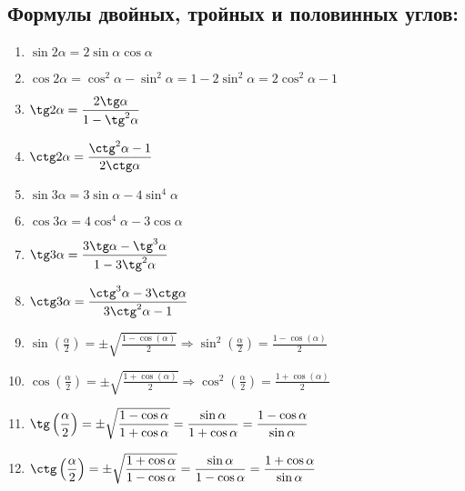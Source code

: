 \documentclass[12pt, a4paper]{article}
\begin{document}
\subsection{Формулы двойных, тройных и половинных углов:}
\begin{enumerate}
	\item $\sin 2\alpha = 2\sin \alpha \cos \alpha$
	\item $\cos 2\alpha = \cos^2 \alpha - \sin^2 \alpha = 1-2\sin^2 \alpha = 2\cos^2 \alpha - 1$
	\item $\tg 2 \alpha = \displaystyle \frac{2\tg \alpha}{1-\tg^2 \alpha}$
	\item $\ctg 2 \alpha = \displaystyle \frac{\ctg^2 \alpha-1}{2\ctg \alpha}$
	\item $\sin 3\alpha = 3\sin \alpha - 4 \sin^4 \alpha$
	\item $\cos 3\alpha = 4\cos^4 \alpha - 3 \cos \alpha$
	\item $\tg 3\alpha = \displaystyle \frac{3\tg \alpha - \tg^3\alpha}{1-3\tg^2\alpha}$
	\item $\ctg 3 \alpha =\displaystyle \frac{\ctg^3\alpha-3\ctg \alpha}{3\ctg ^2 \alpha -1}$
	\item $\sin \left(\displaystyle\frac{\alpha}{2}\right) = \pm \sqrt{\displaystyle \frac{1-\cos(\alpha)}{2}} \Rightarrow \sin^2\left(\displaystyle\frac{\alpha}{2}\right) = \displaystyle \frac{1-\cos(\alpha)}{2} $
	\item $\cos \left(\displaystyle\frac{\alpha}{2}\right) = \pm \sqrt{\displaystyle \frac{1+\cos(\alpha)}{2}} \Rightarrow \cos^2\left(\displaystyle\frac{\alpha}{2}\right) = \displaystyle \frac{1+\cos(\alpha)}{2} $
	\item $\tg \left(\displaystyle\frac{\alpha}{2}\right) = \pm \sqrt{\displaystyle\frac{1-\cos \alpha}{1+\cos \alpha}} = \displaystyle\frac{\sin \alpha}{1+\cos \alpha} = \frac{1-\cos \alpha}{\sin \alpha}$
	\item $\ctg \left(\displaystyle\frac{\alpha}{2}\right) = \pm \sqrt{\displaystyle\frac{1+\cos \alpha}{1-\cos \alpha}} = \displaystyle\frac{\sin \alpha}{1-\cos \alpha} = \frac{1+\cos \alpha}{\sin \alpha}$
\end{enumerate}
\end{document}
